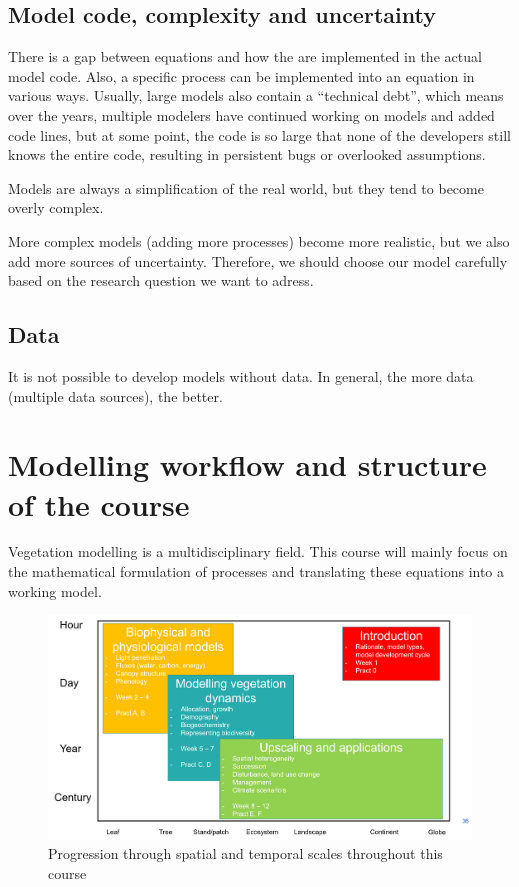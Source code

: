 \documentclass[
  12pt,
  oneside]{book}
\begin{document}
\hypertarget{model-code-complexity-and-uncertainty}{%
\subsection{Model code, complexity and uncertainty}\label{model-code-complexity-and-uncertainty}}

There is a gap between equations and how the are implemented in the actual model code. Also, a specific process can be implemented into an equation in various ways. Usually, large models also contain a ``technical debt'', which means over the years, multiple modelers have continued working on models and added code lines, but at some point, the code is so large that none of the developers still knows the entire code, resulting in persistent bugs or overlooked assumptions.

Models are always a simplification of the real world, but they tend to become overly complex.

More complex models (adding more processes) become more realistic, but we also add more sources of uncertainty. Therefore, we should choose our model carefully based on the research question we want to adress.

\hypertarget{data}{%
\subsection{Data}\label{data}}

It is not possible to develop models without data. In general, the more data (multiple data sources), the better.

\hypertarget{modelling-workflow-and-structure-of-the-course}{%
\section{Modelling workflow and structure of the course}\label{modelling-workflow-and-structure-of-the-course}}

Vegetation modelling is a multidisciplinary field. This course will mainly focus on the mathematical formulation of processes and translating these equations into a working model.

\begin{figure}

{\centering \includegraphics[width=0.9\linewidth]{figures/chap1/course_overview} 

}

\caption{Progression through spatial and temporal scales throughout this course}\label{fig:f12}
\end{figure}
\end{document}
